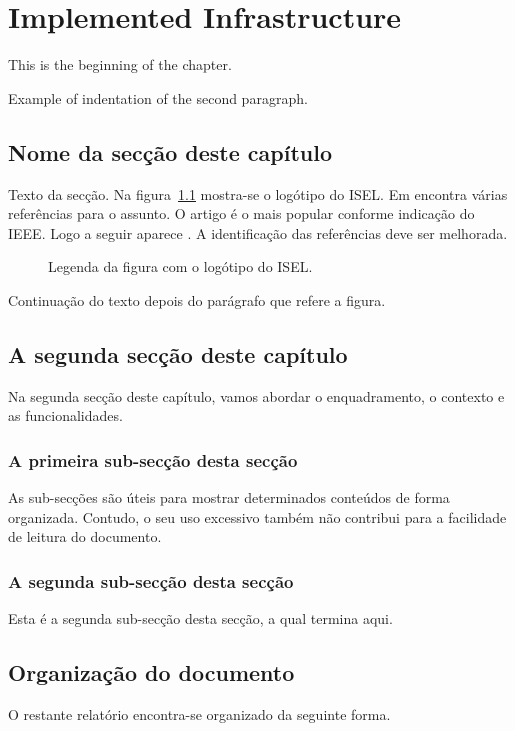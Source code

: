 %
%
\chapter{Implemented Infrastructure} \label{cap:intro}

This is the beginning of the chapter.

Example of indentation of the second paragraph.

%
%
\section{Nome da secção deste capítulo} \label{sec11}

Texto da secção. Na figura~\ref{fig:logotipo} mostra-se o logótipo do ISEL. Em \cite{wiki:bigdata2019} encontra várias referências para o assunto. O artigo \cite{6547630} é o mais popular conforme indicação do IEEE. Logo a seguir aparece \cite{6824752}. A identificação das referências deve ser melhorada.

\begin{figure}[h]
\begin{center}
\end{center}
\caption{Legenda da figura com o logótipo do ISEL.}\label{fig:logotipo}
\end{figure}

Continuação do texto depois do parágrafo que refere a figura.


%
%
\section{A segunda secção deste capítulo} \label{sec12}
Na segunda secção deste capítulo, vamos abordar o enquadramento,
o contexto e as funcionalidades.

%
%
\subsection{A primeira sub-secção desta secção} \label{sec121}
As sub-secções são úteis para mostrar determinados conteúdos de forma
organizada. Contudo, o seu uso excessivo também não contribui para a facilidade
de leitura do documento.

%
%
\subsection{A segunda sub-secção desta secção} \label{sec122}
Esta é a segunda sub-secção desta secção, a qual termina aqui.


%
%
\section{Organização do documento} \label{sec13}
O restante relatório encontra-se organizado da seguinte forma.